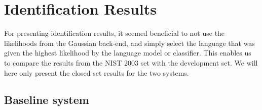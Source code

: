 \chapter{Identification Results}

For presenting identification results, it seemed beneficial to not use the likelihoods from the Gaussian back-end, and simply select the language that was given the highest likelihood by the language model or classifier. This enables us to compare the results from the NIST 2003 set with the development set. We will here only present the closed set results for the two systems.

\section{Baseline system}

